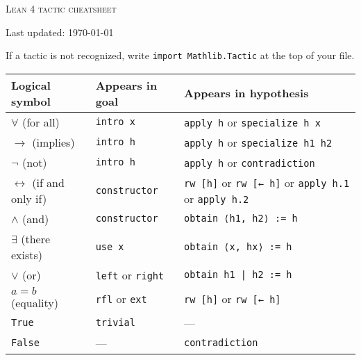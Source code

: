 \documentclass[a4paper]{article}
\newcommand{\lean}[1]{{\tt #1}}
\begin{document}
\pagestyle{empty}
\begin{center}
 {\large\textsc{Lean 4 tactic cheatsheet}}

 {\scriptsize Last updated: \today}
\end{center}

\begin{center}
If a tactic is not recognized, write \lean{import Mathlib.Tactic} at the top of your file.\\
\smallskip

\setlength\tabcolsep{5mm}
\def\arraystretch{1.3}
\begin{tabular}{@{}lll@{}}
  \toprule
  Logical symbol & Appears in goal & Appears in hypothesis \\
  \midrule
  $\forall$ (for all) & \lean{intro x} & \lean{apply h} or \lean{specialize h x}  \\
  $\to$ (implies) & \lean{intro h} & \lean{apply h} or \lean{specialize h1 h2} \\
  $\neg$ (not) & \lean{intro h} & \lean{apply h} or \lean{contradiction}  \\
  $\leftrightarrow$ (if and only if)\qquad & \lean{constructor}  & \lean{rw [h]} or \lean{rw [← h]} or \lean{apply h.1} or \lean{apply h.2}\\
  $\wedge$ (and) & \lean{constructor} & \lean{obtain ⟨h1, h2⟩ := h} \\
  $\exists$ (there exists) & \lean{use x} & \lean{obtain ⟨x, hx⟩ := h} \\
  $\vee$ (or) & \lean{left} or \lean{right} & \lean{obtain h1 | h2 := h} \\
  $a = b$ (equality) & \lean{rfl} or \lean{ext} & \lean{rw [h]} or \lean{rw [← h]} \\
  \lean{True} & \lean{trivial} & --- \\
  \lean{False} & --- & \lean{contradiction} \\
\bottomrule
\end{tabular}
\end{center}
\end{document}
